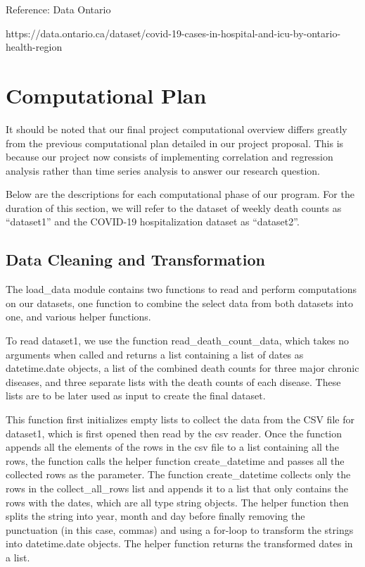 \documentclass[fontsize=11pt]{article}
\begin{document}
Reference: Data Ontario

https://data.ontario.ca/dataset/covid-19-cases-in-hospital-and-icu-by-ontario-health-region


\section*{Computational Plan}

It should be noted that our final project computational overview differs greatly from the previous computational plan detailed in our project proposal. This is because our project now consists of implementing correlation and regression analysis rather than time series analysis to answer our research question.

Below are the descriptions for each computational phase of our program. For the duration of this section, we will refer to the dataset of weekly death counts as “dataset1” and the COVID-19 hospitalization dataset as “dataset2”.
 

\subsection*{Data Cleaning and Transformation}
The load\_data module contains two functions to read and perform computations on our datasets, one function to combine the select data from both datasets into one, and various helper functions.

To read dataset1, we use the function read\_death\_count\_data, which takes no arguments when called and returns a list containing a list of dates as datetime.date objects, a list of the combined death counts for three major chronic diseases, and three separate lists with the death counts of each disease. These lists are to be later used as input to create the final dataset.


\noindent
This function first initializes empty lists to collect the data from the CSV file for dataset1, which is first opened then read by the csv reader. Once the function appends all the elements of the rows in the csv file to a list containing all the rows, the function calls the helper function create\_datetime and passes all the collected rows as the parameter. The function create\_datetime collects only the rows in the collect\_all\_rows list and appends it to a list that only contains the rows with the dates, which are all type string objects. The helper function then splits the string into year, month and day before finally removing the punctuation (in this case, commas) and using a for-loop to transform the strings into datetime.date objects. The helper function returns the transformed dates in a list.
\end{document}
